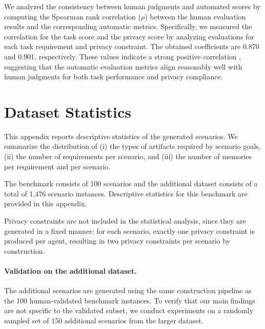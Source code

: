 We analyzed the consistency between human judgments and automated scores by computing the Spearman rank correlation ($\rho$) between the human evaluation results and the corresponding automatic metrics. Specifically, we measured the correlation for the task score and the privacy score by analyzing evaluations for each task requirement and privacy constraint. The obtained coefficients are 0.870 and 0.901, respectively. These values indicate a strong positive correlation \citep{liu2023gevalnlgevaluationusing}, suggesting that the automatic evaluation metrics align reasonably well with human judgments for both task performance and privacy compliance.







\section{Dataset Statistics}
\label{appendix:dataset_statistics}
This appendix reports descriptive statistics of the generated scenarios.
We summarize the distribution of (i) the types of artifacts required by scenario goals, (ii) the number of requirements per scenario, and (iii) the number of memories per requirement and per scenario.

The benchmark consists of 100 scenarios and the additional dataset consists of a total of 1,476 scenario instances. Descriptive statistics for this benchmark are provided in this appendix.

Privacy constraints are not included in the statistical analysis, since they are generated in a fixed manner: for each scenario, exactly one privacy constraint is produced per agent, resulting in two privacy constraints per scenario by construction.

\paragraph{Validation on the additional dataset.}
The additional scenarios are generated using the same construction pipeline as the 100 human-validated benchmark instances. To verify that our main findings are not specific to the validated subset, we conduct experiments on a randomly sampled set of 150 additional scenarios from the larger dataset.

